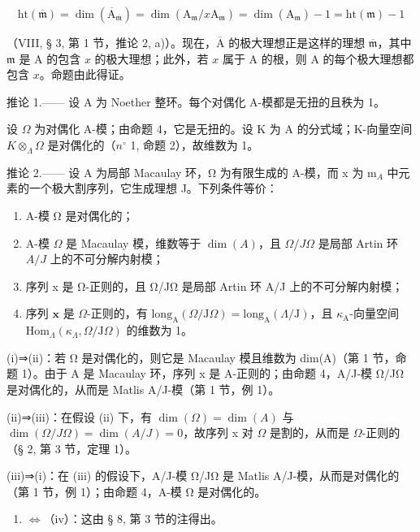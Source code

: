 \[
\mathrm{ht} (\overline {{\mathfrak {m}}}) = \dim (\overline {{\mathrm{A}}} _ {\overline {{\mathfrak {m}}}}) = \dim (\mathrm{A} _ {\mathfrak {m}} / x \mathrm{A} _ {\mathfrak {m}}) = \dim (\mathrm{A} _ {\mathfrak {m}}) - 1 = \mathrm{ht} (\mathfrak {m}) - 1
\]

（VIII, § 3, 第 1 节，推论 2, a)）。现在，\(\overline{\mathrm{A}}\) 的极大理想正是这样的理想 \(\overline{\mathfrak{m}}\)，其中 \(\mathfrak{m}\) 是 A 的包含 \(x\) 的极大理想；此外，若 \(x\) 属于 A 的根，则 A 的每个极大理想都包含 \(x\)。命题由此得证。

推论 1.—— 设 A 为 Noether 整环。每个对偶化 A-模都是无扭的且秩为 1。

设 \(\Omega\) 为对偶化 A-模；由命题 4，它是无扭的。设 K 为 A 的分式域；K-向量空间 \(K \otimes_{\Lambda} \Omega\) 是对偶化的（\(n^{\circ}\) 1, 命题 2），故维数为 1。

推论 2.—— 设 A 为局部 Macaulay 环，Ω 为有限生成的 A-模，而 x 为 m\(_{A}\) 中元素的一个极大割序列，它生成理想 J。下列条件等价：

\begin{enumerate}
\def\labelenumi{(\roman{enumi})}
\item
  A-模 Ω 是对偶化的；
\item
  A-模 \(\Omega\) 是 Macaulay 模，维数等于 \(\dim(A)\)，且 \(\Omega/J\Omega\) 是局部 Artin 环 \(A/J\) 上的不可分解内射模；
\item
  序列 x 是 Ω-正则的，且 Ω/JΩ 是局部 Artin 环 A/J 上的不可分解内射模；
\item
  序列 \(\mathbf{x}\) 是 \(\Omega\)-正则的，有 \(\mathrm{long}_{\mathrm{A}}(\Omega/\mathrm{J}\Omega) = \mathrm{long}_{\mathrm{A}}(\Lambda/\mathrm{J})\)，且 \(\kappa_{\mathrm{A}}\)-向量空间 \(\mathrm{Hom}_{\Lambda}(\kappa_{\Lambda}, \Omega/\mathrm{J}\Omega)\) 的维数为 1。
\end{enumerate}

(i)⇒(ii)：若 Ω 是对偶化的，则它是 Macaulay 模且维数为 dim(A)（第 1 节，命题 1）。由于 A 是 Macaulay 环，序列 x 是 A-正则的；由命题 4，A/J-模 Ω/JΩ 是对偶化的，从而是 Matlis A/J-模（第 1 节，例 1）。

(ii)⇒(iii)：在假设 (ii) 下，有 \(\dim(\Omega)=\dim(A)\) 与 \(\dim(\Omega/J\Omega)=\dim(A/J)=0\)，故序列 x 对 \(\Omega\) 是割的，从而是 \(\Omega\)-正则的（§ 2, 第 3 节，定理 1）。

(iii)⇒(i)：在 (iii) 的假设下，A/J-模 Ω/JΩ 是 Matlis A/J-模，从而是对偶化的（第 1 节，例 1）；由命题 4，A-模 Ω 是对偶化的。

\begin{enumerate}
\def\labelenumi{(\roman{enumi})}
\setcounter{enumi}{2}
\tightlist
\item
  \(\Leftrightarrow\)（iv）：这由 § 8, 第 3 节的注得出。
\end{enumerate}

